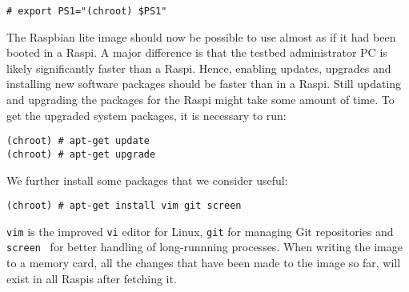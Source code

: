 \begin{lstlisting}[]
# export PS1="(chroot) $PS1"
\end{lstlisting}
\FloatBarrier
\vspace{-5mm}

The Raspbian lite image should now be possible to use almost as if it had
been booted in a \ac{Raspi}. A major difference is that the testbed
administrator \ac{PC} is likely significantly faster than a \ac{Raspi}.
Hence, enabling updates, upgrades and installing new software packages
should be faster than in a \ac{Raspi}. Still updating and upgrading
the packages for the \ac{Raspi} might take some amount of time.
To get the upgraded system packages, it is necessary to run:

\begin{lstlisting}[]
(chroot) # apt-get update
(chroot) # apt-get upgrade
\end{lstlisting}
\FloatBarrier
\vspace{-5mm}

We further install some packages that we consider useful:
\begin{lstlisting}[]
(chroot) # apt-get install vim git screen
\end{lstlisting}
\FloatBarrier
\vspace{-5mm}

\texttt{vim} is the improved \texttt{vi} editor for Linux, \texttt{git}
for managing Git repositories and \texttt{screen}~\cite{gnu_screen} for better handling of
long-runnning processes. When writing the image to a memory card, all the
changes that have been made to the image so far, will exist in all
\ac{Raspi}s after fetching it.
